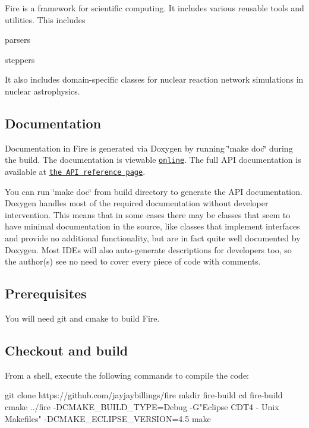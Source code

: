 Fire is a framework for scientific computing. It includes various reusable tools and utilities. This includes
\begin{DoxyItemize}
\item parsers
\item steppers
\end{DoxyItemize}

It also includes domain-\/specific classes for nuclear reaction network simulations in nuclear astrophysics.

\subsection*{Documentation}

Documentation in Fire is generated via Doxygen by running \char`\"{}make doc\char`\"{} during the build. The documentation is viewable \href{http://www.jayjaybillings.com/fire}{\tt online}. The full A\+PI documentation is available at \href{http://www.jayjaybillings.com/fire/api/html/}{\tt the A\+PI reference page}.

You can run \char`\"{}make doc\char`\"{} from build directory to generate the A\+PI documentation. Doxygen handles most of the required documentation without developer intervention. This means that in some cases there may be classes that seem to have minimal documentation in the source, like classes that implement interfaces and provide no additional functionality, but are in fact quite well documented by Doxygen. Most I\+D\+Es will also auto-\/generate descriptions for developers too, so the author(s) see no need to cover every piece of code with comments.

\subsection*{Prerequisites}

You will need git and cmake to build Fire.

\subsection*{Checkout and build}

From a shell, execute the following commands to compile the code\+:


\begin{DoxyCode}
git clone https://github.com/jayjaybillings/fire
mkdir fire-build
cd fire-build
cmake ../fire -DCMAKE\_BUILD\_TYPE=Debug -G"Eclipse CDT4 - Unix Makefiles" -DCMAKE\_ECLIPSE\_VERSION=4.5
make
\end{DoxyCode}


